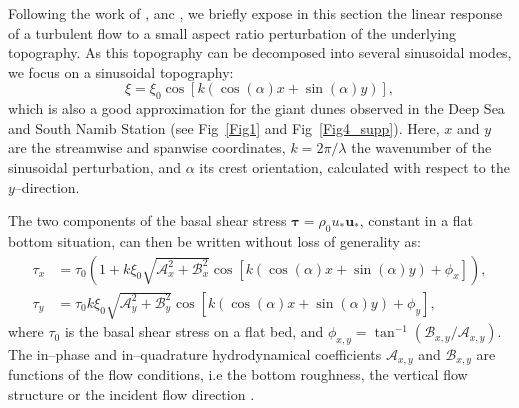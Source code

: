 Following the work of \citet{Fourriere2010}, \citet{Andreotti2012} anc \citet{andreotti2009}, we briefly expose in this section the linear response of a turbulent flow to a small aspect ratio perturbation of the underlying topography. As this topography can be decomposed into several sinusoidal modes, we focus on a sinusoidal topography:
\begin{equation}
  \xi = \xi_{0}\cos\left[k\left(\cos(\alpha)x + \sin(\alpha)y\right)\right],
\end{equation}
which is also a good approximation for the giant dunes observed in the Deep Sea and South Namib Station (see Fig~\ref{Fig1} and Fig~\ref{Fig4_supp}). Here, $x$ and $y$ are the streamwise and spanwise coordinates, $k=2\pi/\lambda$ the wavenumber of the sinusoidal perturbation, and $\alpha$ its crest orientation, calculated with respect to the $y$--direction.

The two components of the basal shear stress $\boldsymbol{\tau} = \rho_{0} u_{*}\boldsymbol{u}_{*}$, constant in a flat bottom situation, can then be written without loss of generality as:
\begin{align}
  \tau_{x} & = \tau_{0}\left(1 + k\xi_{0}\sqrt{\mathcal{A}_{x}^{2} + \mathcal{B}_{x}^{2}}\cos\left[k\left(\cos(\alpha)x + \sin(\alpha)y\right) + \phi_{x}\right]\right), \\
  \tau_{y} & = \tau_{0}k\xi_{0}\sqrt{\mathcal{A}_{y}^{2} + \mathcal{B}_{y}^{2}}\cos\left[k\left(\cos(\alpha)x + \sin(\alpha)y\right) + \phi_{y}\right],
\end{align}
where $\tau_{0}$ is the basal shear stress on a flat bed, and $\phi_{x, y} = \tan^{-1}\left(\mathcal{B}_{x, y}/\mathcal{A}_{x, y}\right)$. The in--phase and in--quadrature hydrodynamical coefficients $\mathcal{A}_{x, y}$ and $\mathcal{B}_{x, y}$ are functions of the flow conditions, i.e the bottom roughness, the vertical flow structure or the incident flow direction \citep{Fourriere2010, andreotti2009, Andreotti2012}.

